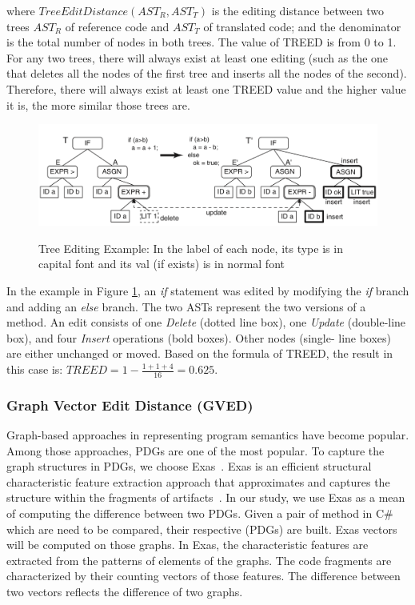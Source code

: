 where $TreeEditDistance\left(AST_R, AST_T\right)$ is the editing
distance between two trees $AST_R$ of reference code and $AST_T$ of
translated code; and the denominator is the total number of nodes in
both trees. The value of TREED is from 0 to 1.
%
For any two trees, there will always exist at least one editing (such
as the one that deletes all the nodes of the first tree and inserts all
the nodes of the second). Therefore, there will always exist at least
one TREED value and the higher value it is, the more similar those
trees are.

\begin{figure}[h]
	\caption{Tree Editing Example: In the label of each node, its type is in capital font and its val (if exists) is in normal font}
	\includegraphics[scale=0.3]{img/treed.png}
	\centering
	\label{fig:treed}
\end{figure}

In the example in Figure \ref{fig:treed}, an \textit{if} statement was
edited by modifying the \textit{if} branch and adding an \textit{else}
branch. The two ASTs represent the two versions of a method. An edit
consists of one \textit{Delete} (dotted line box), one \textit{Update}
(double-line box), and four \textit{Insert} operations (bold
boxes). Other nodes (single- line boxes) are either unchanged or
moved. Based on the formula of TREED, the result in this case is:
$TREED = 1 - \frac{1 + 1 + 4}{16}=0.625$.

\subsubsection{\textbf{Graph Vector Edit Distance (GVED)}}

Graph-based approaches in representing program semantics have become
popular. Among those approaches, PDGs are one of the most popular.  To
capture the graph structures in PDGs, we choose Exas~\cite{fase09}.
Exas is an efficient structural characteristic feature extraction
approach that approximates and captures the structure within the
fragments of artifacts~\cite{fase09}.  In our study, we use Exas as a
mean of computing the difference between two PDGs. Given a pair of
method in C\# which are need to be compared, their respective
(PDGs) are built.
Exas vectors will be computed on those graphs. In Exas, the
characteristic features are extracted from the patterns of elements of
the graphs. The code fragments are characterized by their counting
vectors of those features. The difference between two vectors reflects
the difference of two graphs.


